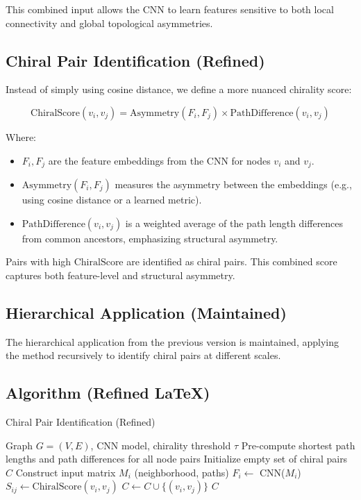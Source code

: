 \documentclass[12pt, a4paper]{article}
\begin{document}
This combined input allows the CNN to learn features sensitive to both local connectivity and global topological asymmetries.

\subsection{Chiral Pair Identification (Refined)}

Instead of simply using cosine distance, we define a more nuanced chirality score:

\begin{equation}
\text{ChiralScore}(v_i, v_j) = \text{Asymmetry}(F_i, F_j) \times \text{PathDifference}(v_i, v_j)
\end{equation}

Where:

\begin{itemize}
    \item $F_i, F_j$ are the feature embeddings from the CNN for nodes $v_i$ and $v_j$.
    \item $\text{Asymmetry}(F_i, F_j)$ measures the asymmetry between the embeddings (e.g., using cosine distance or a learned metric).
    \item $\text{PathDifference}(v_i, v_j)$ is a weighted average of the path length differences from common ancestors, emphasizing structural asymmetry.
\end{itemize}

Pairs with high $\text{ChiralScore}$ are identified as chiral pairs. This combined score captures both feature-level and structural asymmetry.

\subsection{Hierarchical Application (Maintained)}

The hierarchical application from the previous version is maintained, applying the method recursively to identify chiral pairs at different scales.

\subsection{Algorithm (Refined LaTeX)}

\begin{algorithm}[H]
\caption{Chiral Pair Identification (Refined)}
\begin{algorithmic}[1]
\Require Graph $G=(V,E)$, CNN model, chirality threshold $\tau$
\State Pre-compute shortest path lengths and path differences for all node pairs
\State Initialize empty set of chiral pairs $C$
    \State Construct input matrix $M_i$ (neighborhood, paths)
    \State $F_i \gets$ CNN($M_i$)
\EndFor
{}
    \State $S_{ij} \gets \text{ChiralScore}(v_i, v_j)$
        \State $C \gets C \cup \{(v_i, v_j)\}$
    \EndIf
\EndFor
\Return $C$
\end{algorithmic}
\end{algorithm}
\end{document}
